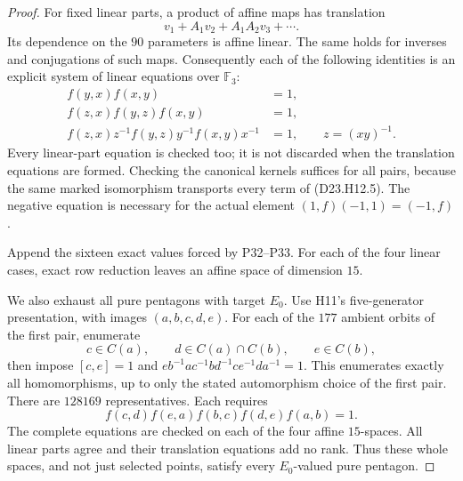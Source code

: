 \begin{proof}
For fixed linear parts, a product of affine maps has
translation
\[
 v_1+A_1v_2+A_1A_2v_3+\cdots.
\]
Its dependence on the $90$ parameters is affine linear.
The same holds for inverses and conjugations of such maps.
Consequently each of the following identities is an
explicit system of linear equations over $\mathbb F_3$:
\[
 \begin{split}
 f(y,x)f(x,y)&=1,\\
 f(z,x)f(y,z)f(x,y)&=1,\\
 f(z,x)z^{-1}f(y,z)y^{-1}f(x,y)x^{-1}&=1,
                  \qquad z=(xy)^{-1}.
 \end{split}
                                                        \tag{D23.H12.5}
\]
Every linear-part equation is checked too; it is not
discarded when the translation equations are formed.
Checking the canonical kernels suffices for all pairs,
because the same marked isomorphism transports every term
of (D23.H12.5). The negative equation is necessary for
the actual element $(1,f)(-1,1)=(-1,f)$.

Append the sixteen exact values forced by P32--P33.
For each of the four linear cases, exact row reduction
leaves an affine space of dimension $15$.

We also exhaust all pure pentagons with target $E_0$.
Use H11's five-generator presentation, with images
$(a,b,c,d,e)$. For each of the $177$ ambient orbits of
the first pair, enumerate
\[
 c\in C(a),\qquad d\in C(a)\cap C(b),\qquad e\in C(b),
\]
then impose $[c,e]=1$ and
$e b^{-1}a c^{-1}b d^{-1}c e^{-1}d a^{-1}=1$.
This enumerates exactly all homomorphisms, up to only the
stated automorphism choice of the first pair. There are
$128169$ representatives. Each requires
\[
                  f(c,d)f(e,a)f(b,c)f(d,e)f(a,b)=1.
                                                        \tag{D23.H12.6}
\]
The complete equations are checked on each of the four
affine $15$-spaces. All linear parts agree and their
translation equations add no rank. Thus these whole
spaces, and not just selected points, satisfy every
$E_0$-valued pure pentagon.


\end{proof}
